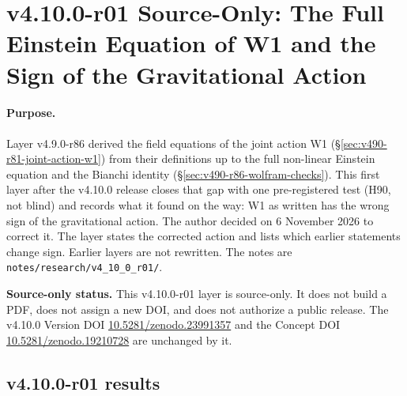 \clearpage
\section*{v4.10.0-r01 Source-Only: The Full Einstein Equation of W1 and the Sign of the Gravitational Action}
\label{sec:v4100-r01-einstein-sign}

\paragraph{Purpose.}
Layer v4.9.0-r86 derived the field equations of the joint action W1 (\S\ref{sec:v490-r81-joint-action-w1}) from their definitions up to
the full non-linear Einstein equation and the Bianchi identity (\S\ref{sec:v490-r86-wolfram-checks}).  This first layer after the
v4.10.0 release closes that gap with one pre-registered test (H90, not blind) and records what it found on the way: W1 as written has the
wrong sign of the gravitational action.  The author decided on 6 November 2026 to correct it.  The layer states the corrected action and
lists which earlier statements change sign.  Earlier layers are not rewritten.  The notes are
\texttt{notes/\allowbreak research/\allowbreak v4\_10\_0\_r01/}.

\noindent\textbf{Source-only status.}
This v4.10.0-r01 layer is source-only.  It does not build a PDF, does not assign a new DOI,
and does not authorize a public release.  The v4.10.0 Version DOI
\href{https://doi.org/10.5281/zenodo.23991357}{10.5281/zenodo.23991357} and the Concept DOI
\href{https://doi.org/10.5281/zenodo.19210728}{10.5281/zenodo.19210728} are unchanged by it.

\subsection*{v4.10.0-r01 results}
\label{subsec:v4100-r01-results}

